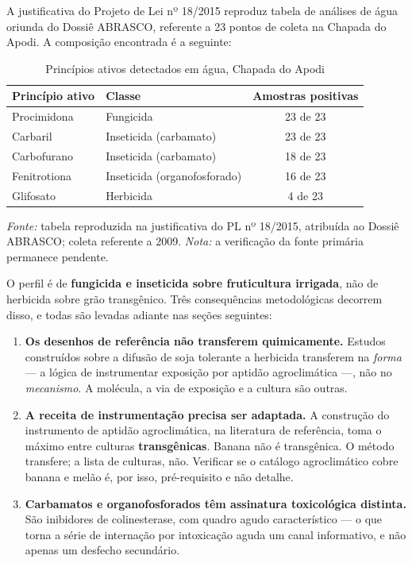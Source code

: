 A justificativa do Projeto de Lei nº 18/2015 reproduz tabela de análises de água
oriunda do Dossiê ABRASCO, referente a 23 pontos de coleta na Chapada do Apodi.
A composição encontrada é a seguinte:

\begin{table}[htbp]
\centering
\caption{Princípios ativos detectados em água, Chapada do Apodi}
\label{tab:abrasco}
\begin{tabular}{llc}
\hline
Princípio ativo & Classe & Amostras positivas \\
\hline
Procimidona & Fungicida & 23 de 23 \\
Carbaril & Inseticida (carbamato) & 23 de 23 \\
Carbofurano & Inseticida (carbamato) & 18 de 23 \\
Fenitrotiona & Inseticida (organofosforado) & 16 de 23 \\
Glifosato & Herbicida & 4 de 23 \\
\hline
\end{tabular}

\vspace{0.5em}
\begin{minipage}{0.85\textwidth}
\footnotesize \emph{Fonte:} tabela reproduzida na justificativa do PL nº
18/2015, atribuída ao Dossiê ABRASCO; coleta referente a 2009. \emph{Nota:} a
verificação da fonte primária permanece pendente.
\end{minipage}
\end{table}

O perfil é de \textbf{fungicida e inseticida sobre fruticultura irrigada}, não de
herbicida sobre grão transgênico. Três consequências metodológicas decorrem
disso, e todas são levadas adiante nas seções seguintes:

\begin{enumerate}
  \item \textbf{Os desenhos de referência não transferem quimicamente.} Estudos
    construídos sobre a difusão de soja tolerante a herbicida transferem na
    \emph{forma} --- a lógica de instrumentar exposição por aptidão agroclimática
    ---, não no \emph{mecanismo}. A molécula, a via de exposição e a cultura são
    outras.

  \item \textbf{A receita de instrumentação precisa ser adaptada.} A construção
    do instrumento de aptidão agroclimática, na literatura de referência, toma o
    máximo entre culturas \textbf{transgênicas}. Banana não é transgênica. O
    método transfere; a lista de culturas, não. Verificar se o catálogo
    agroclimático cobre banana e melão é, por isso, pré-requisito e não detalhe.

  \item \textbf{Carbamatos e organofosforados têm assinatura toxicológica
    distinta.} São inibidores de colinesterase, com quadro agudo característico
    --- o que torna a série de internação por intoxicação aguda um canal
    informativo, e não apenas um desfecho secundário.
\end{enumerate}


